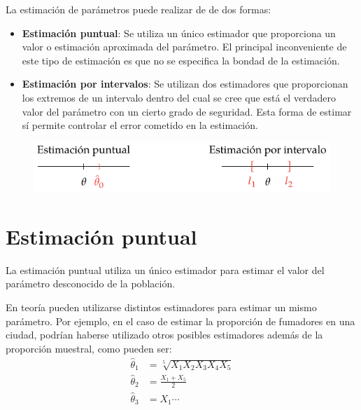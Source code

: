 \documentclass[
  a4paper,
]{scrreport}
\providecommand{\tightlist}{%
  \setlength{\itemsep}{0pt}\setlength{\parskip}{0pt}}\usepackage{longtable,booktabs,array}
\theoremstyle{definition}
\theoremstyle{definition}
\theoremstyle{plain}
\theoremstyle{remark}
\begin{document}
La estimación de parámetros puede realizar de de dos formas:

\begin{itemize}
\tightlist
\item
  \textbf{Estimación puntual}: Se utiliza un único estimador que
  proporciona un valor o estimación aproximada del parámetro. El
  principal inconveniente de este tipo de estimación es que no se
  especifica la bondad de la estimación.
\item
  \textbf{Estimación por intervalos}: Se utilizan dos estimadores que
  proporcionan los extremos de un intervalo dentro del cual se cree que
  está el verdadero valor del parámetro con un cierto grado de
  seguridad. Esta forma de estimar sí permite controlar el error
  cometido en la estimación.
\end{itemize}

\begin{figure}

{\centering \includegraphics[width=1\textwidth,height=\textheight]{img/estimacion/estimacion-puntual-intervalo.pdf}

}

\end{figure}

\hypertarget{estimaciuxf3n-puntual}{%
\section{Estimación puntual}\label{estimaciuxf3n-puntual}}

La estimación puntual utiliza un único estimador para estimar el valor
del parámetro desconocido de la población.

En teoría pueden utilizarse distintos estimadores para estimar un mismo
parámetro. Por ejemplo, en el caso de estimar la proporción de fumadores
en una ciudad, podrían haberse utilizado otros posibles estimadores
además de la proporción muestral, como pueden ser: \begin{align*}
\hat \theta_1 &= \sqrt[5]{X_1X_2X_3X_4X_5}\\
\hat \theta_2 &= \frac{X_1+X_5}{2}\\
\hat \theta_3 &= X_1 \cdots
\end{align*}
\end{document}
